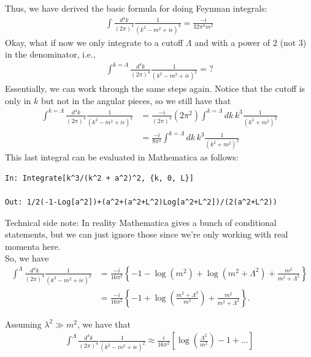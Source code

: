 \documentclass{book}
\theoremstyle{definition}
\newcommand{\f}[2]{\frac{#1}{#2}}
\newcommand{\lp}{\left(}
\newcommand{\rp}{\right)}
\newcommand{\lb}{\left[}
\newcommand{\rb}{\right]}
\newcommand{\lc}{\left\{}
\newcommand{\rc}{\right\}}
\begin{document}
Thus, we have derived the basic formula for doing Feynman integrals:
\begin{align}
\boxed{\int \f{d^4k}{(2\pi)^4} \f{1}{(k^2 - m^2+ i\epsilon)^3} = \f{-i}{32 \pi^2 m^2}}
\end{align}
Okay, what if now we only integrate to a cutoff $\Lambda$ and with a power of $2$ (not $3$) in the denominator, i.e.,
\begin{align}
\int^{k=\Lambda} \f{d^4k}{(2\pi)^4} \f{1}{(k^2 - m^2+ i\epsilon)^2} = ?
\end{align}
Essentially, we can work through the same steps again. Notice that the cutoff is only in $k$ but not in the angular pieces, so we still have that
\begin{align}
\int^{k=\Lambda} \f{d^4k}{(2\pi)^4} \f{1}{(k^2 - m^2+ i\epsilon)^2} &= \f{-i}{(2\pi)^4}(2\pi^2)\int^{k=\Lambda} dk\,k^3\f{1}{(k^2 + m^2)^2}\nonumber\\
&= \f{-i}{8\pi^2}\int^{k=\Lambda} dk\,k^3\f{1}{(k^2 + m^2)^2}
\end{align}
This last integral can be evaluated in Mathematica as follows:
\begin{lstlisting}
In: Integrate[k^3/(k^2 + a^2)^2, {k, 0, L}]

Out: 1/2(-1-Log[a^2])+(a^2+(a^2+L^2)Log[a^2+L^2])/(2(a^2+L^2)) 
\end{lstlisting}

Technical side note: In reality Mathematica gives a bunch of conditional statements, but we can just ignore those since we're only working with real momenta here. \\

So, we have
\begin{align}
\int^{\Lambda} \f{d^4k}{(2\pi)^4} \f{1}{(k^2 - m^2+ i\epsilon)^2} &= \f{-i}{16\pi^2}\lc -1 - \log(m^2) + \log(m^2 + \Lambda^2) + \f{m^2 }{m^2 + \Lambda^2} \rc\nonumber\\
&= \f{-i}{16\pi^2}\lc -1  + \log\lp\f{ m^2 + \Lambda^2}{m^2} \rp+ \f{m^2 }{m^2 + \Lambda^2} \rc.
\end{align}

Assuming $\lambda^2 \gg m^2$, we have that
\begin{align}\label{Feynman-int}
\boxed{\int^{\Lambda} \f{d^4k}{(2\pi)^4} \f{1}{(k^2 - m^2+ i\epsilon)^2} \approx \f{i}{16\pi^2} \lb \log\lp \f{\Lambda^2}{m^2} \rp  - 1 + \dots \rb}
\end{align}
\end{document}
